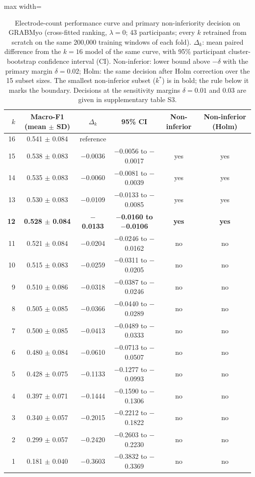\begin{table}[t]
\centering
\small
\caption{Electrode-count performance curve and primary non-inferiority decision on GRABMyo (cross-fitted ranking, $\lambda = 0$; 43 participants; every $k$ retrained from scratch on the same 200,000 training windows of each fold). $\Delta_k$: mean paired difference from the $k = 16$ model of the same curve, with 95\% participant cluster-bootstrap confidence interval (CI). Non-inferior: lower bound above $-\delta$ with the primary margin $\delta = 0.02$; Holm: the same decision after Holm correction over the 15 subset sizes. The smallest non-inferior subset ($k^*$) is in bold; the rule below it marks the boundary. Decisions at the sensitivity margins $\delta = 0.01$ and 0.03 are given in supplementary table S3.}
\label{tab:sparse_ni}
\setlength{\tabcolsep}{4pt}
\begin{adjustbox}{max width=\textwidth}
\begin{tabular}{rccccc}
\toprule
$k$ & Macro-F1 (mean $\pm$ SD) & $\Delta_k$ & 95\% CI & Non-inferior & Non-inferior (Holm) \\
\midrule
16 & 0.541 $\pm$ 0.084 & reference &  &  &  \\
15 & 0.538 $\pm$ 0.083 & $-$0.0036 & $-$0.0056 to $-$0.0017 & yes & yes \\
14 & 0.535 $\pm$ 0.083 & $-$0.0060 & $-$0.0081 to $-$0.0039 & yes & yes \\
13 & 0.530 $\pm$ 0.083 & $-$0.0109 & $-$0.0133 to $-$0.0085 & yes & yes \\
\textbf{12} & \textbf{0.528 $\pm$ 0.084} & \textbf{$-$0.0133} & \textbf{$-$0.0160 to $-$0.0106} & \textbf{yes} & \textbf{yes} \\
\midrule 11 & 0.521 $\pm$ 0.084 & $-$0.0204 & $-$0.0246 to $-$0.0162 & no & no \\
10 & 0.515 $\pm$ 0.083 & $-$0.0259 & $-$0.0311 to $-$0.0205 & no & no \\
9 & 0.510 $\pm$ 0.086 & $-$0.0318 & $-$0.0387 to $-$0.0246 & no & no \\
8 & 0.505 $\pm$ 0.085 & $-$0.0366 & $-$0.0440 to $-$0.0289 & no & no \\
7 & 0.500 $\pm$ 0.085 & $-$0.0413 & $-$0.0489 to $-$0.0333 & no & no \\
6 & 0.480 $\pm$ 0.084 & $-$0.0610 & $-$0.0713 to $-$0.0507 & no & no \\
5 & 0.428 $\pm$ 0.075 & $-$0.1133 & $-$0.1277 to $-$0.0993 & no & no \\
4 & 0.397 $\pm$ 0.071 & $-$0.1444 & $-$0.1590 to $-$0.1306 & no & no \\
3 & 0.340 $\pm$ 0.057 & $-$0.2015 & $-$0.2212 to $-$0.1822 & no & no \\
2 & 0.299 $\pm$ 0.057 & $-$0.2420 & $-$0.2603 to $-$0.2230 & no & no \\
1 & 0.181 $\pm$ 0.040 & $-$0.3603 & $-$0.3832 to $-$0.3369 & no & no \\
\bottomrule
\end{tabular}
\end{adjustbox}
\end{table}
